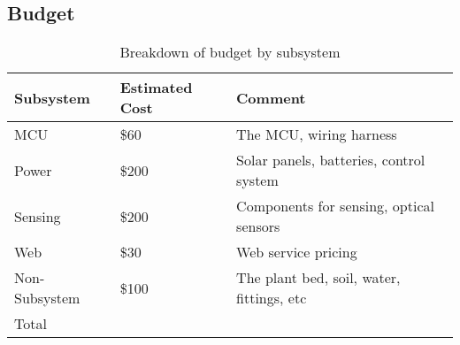 \subsection{Budget}
\begin{table}[H]
    \centering
    \begin{tabularx}{.8\textwidth}
        {
            | >{\raggedright\arraybackslash}X
            | >{\raggedright\arraybackslash}X
            | >{\raggedleft\arraybackslash}X
            |
        }
        \caption{Breakdown of budget by subsystem}\\
        \hline
        Subsystem & Estimated Cost & Comment \\
        \hline
        MCU & \$60 & The MCU, wiring harness \\         %
        \hline
        Power & \$200 & Solar panels, batteries, control system \\
        \hline
        Sensing & \$200 & Components for sensing, optical sensors \\ %
        \hline
        Web & \$30 & Web service pricing \\             %
        \hline
        Non-Subsystem & \$100 & The plant bed, soil, water, fittings, etc \\
        \hline
        Total & \multicolumn{2}{|c|}{\$490}\\           %
        \hline
    \end{tabularx}
\end{table}